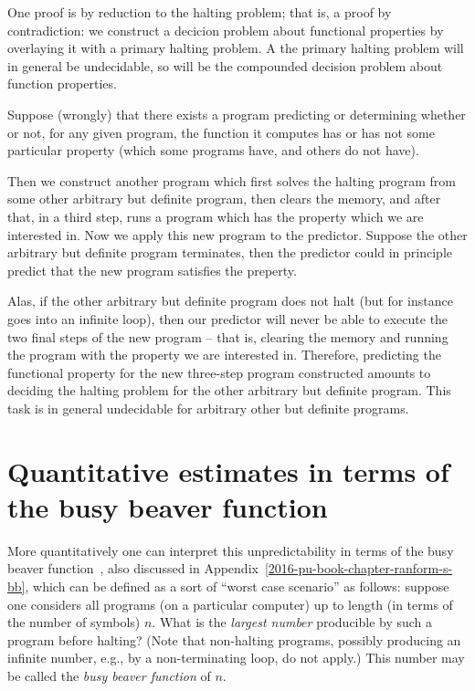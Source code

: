 
One proof is by reduction to the halting problem; that is, a proof by contradiction:
we construct a decicion problem about functional properties by overlaying it with a primary halting problem.
A the primary halting problem will in general be undecidable,
so will be the compounded decision problem about function properties.

Suppose (wrongly) that there exists a program predicting or determining
whether or not, for any given program,
the function it computes has or has  not
some particular property (which some programs have, and others do not have).

Then we construct another program which first solves the halting program from some other arbitrary but definite program,
then clears the  memory, and after that, in a third step, runs a program which has the property which we are interested in.
Now we apply this new program to the predictor.
Suppose the other arbitrary but definite program terminates, then the predictor could in principle predict that
the new program satisfies the preperty.

Alas, if the other arbitrary but definite program does not halt (but for instance goes into an infinite loop),
then our predictor will never be able to execute the two final steps of the new program
-- that is, clearing the memory and running the program with the property we are interested in.
Therefore, predicting the functional property for the new three-step program constructed amounts to deciding
the halting problem for the other arbitrary but definite program.
This task is in general undecidable for arbitrary other but definite programs.



\section{Quantitative estimates in terms of the busy beaver function}

More quantitatively one can interpret this unpredictability in terms of the busy beaver function~\cite{rado,chaitin-ACM,dewdney,brady},
 also discussed in Appendix~\ref{2016-pu-book-chapter-ranform-s-bb}, which can be defined as a sort of ``worst case scenario'' as follows: suppose one considers all  programs (on a particular computer)
up to length (in terms of the number of symbols) $n$.
What is the {\em largest number} producible by such a program before halting?
(Note that non-halting programs, possibly producing an infinite number, e.g., by a non-terminating loop, do not apply.)
This number may be called the {\em  busy beaver function} of $n$.


